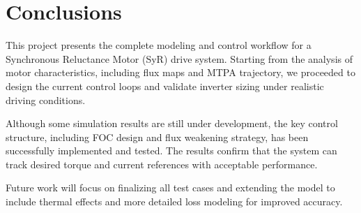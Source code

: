 \section{Conclusions}

This project presents the complete modeling and control workflow for a Synchronous Reluctance Motor (SyR) drive system. Starting from the analysis of motor characteristics, including flux maps and MTPA trajectory, we proceeded to design the current control loops and validate inverter sizing under realistic driving conditions.

Although some simulation results are still under development, the key control structure, including FOC design and flux weakening strategy, has been successfully implemented and tested. The results confirm that the system can track desired torque and current references with acceptable performance.

Future work will focus on finalizing all test cases and extending the model to include thermal effects and more detailed loss modeling for improved accuracy.
